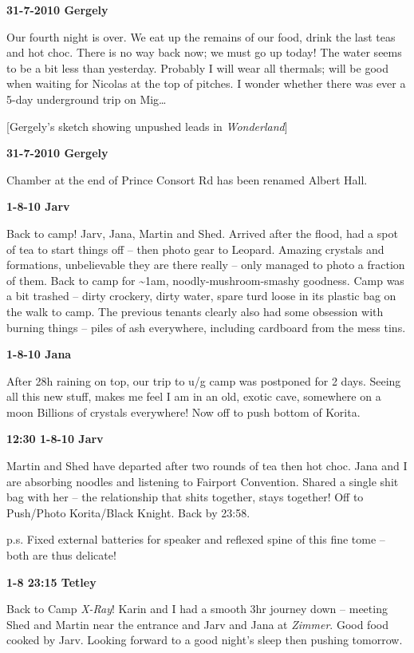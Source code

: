 \textbf{31-7-2010 Gergely}

Our fourth night is over. We eat up the remains of our food, drink the
last teas and hot choc. There is no way back now; we must go up today!
The water seems to be a bit less than yesterday. Probably I will wear
all thermals; will be good when waiting for Nicolas at the top of
pitches. I wonder whether there was ever a 5-day underground trip on
Mig\ldots{}

{[}Gergely's sketch showing unpushed leads in \emph{Wonderland}{]}

\textbf{31-7-2010 Gergely}

Chamber at the end of Prince Consort Rd has been renamed Albert Hall.

\textbf{1-8-10 Jarv}

Back to camp! Jarv, Jana, Martin and Shed. Arrived after the flood, had
a spot of tea to start things off -- then photo gear to Leopard. Amazing
crystals and formations, unbelievable they are there really -- only
managed to photo a fraction of them. Back to camp for
\textasciitilde 1am, noodly-mushroom-smashy goodness. Camp was a bit
trashed -- dirty crockery, dirty water, spare turd loose in its plastic
bag on the walk to camp. The previous tenants clearly also had some
obsession with burning things -- piles of ash everywhere, including
cardboard from the mess tins.

\textbf{1-8-10 Jana}

After 28h raining on top, our trip to u/g camp was postponed for 2 days.
Seeing all this new stuff, makes me feel I am in an old, exotic cave,
somewhere on a moon Billions of crystals everywhere! Now off to push
bottom of Korita.

\textbf{12:30 1-8-10 Jarv}

Martin and Shed have departed after two rounds of tea then hot choc.
Jana and I are absorbing noodles and listening to Fairport Convention.
Shared a single shit bag with her -- the relationship that shits
together, stays together! Off to Push/Photo Korita/Black Knight. Back by
23:58.

p.s. Fixed external batteries for speaker and reflexed spine of this
fine tome -- both are thus delicate!

\textbf{1-8 23:15 Tetley}

Back to Camp \emph{X-Ray}! Karin and I had a smooth 3hr journey down --
meeting Shed and Martin near the entrance and Jarv and Jana at
\emph{Zimmer}. Good food cooked by Jarv. Looking forward to a good
night's sleep then pushing tomorrow.

